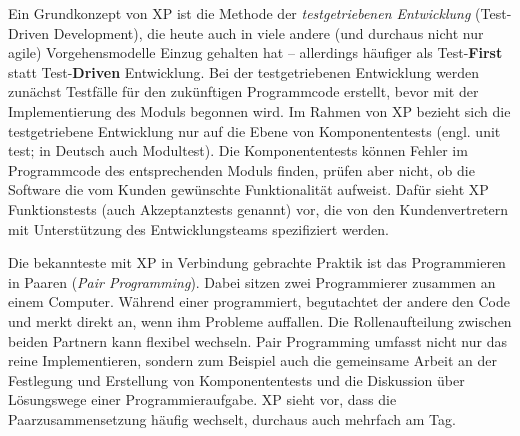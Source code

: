 
Ein Grundkonzept von XP ist die Methode der \textit{testgetriebenen Entwicklung} 
(Test-Driven Development), die heute auch in viele andere (und durchaus nicht nur agile) Vorgehensmodelle Einzug gehalten hat – allerdings häufiger als Test-\textbf{First} statt Test-\textbf{Driven} Entwicklung.
Bei der testgetriebenen Entwicklung  werden zunächst Testfälle für den zukünftigen Programmcode erstellt, bevor mit der Implementierung des Moduls begonnen wird. Im Rahmen von XP bezieht sich die testgetriebene Entwicklung nur auf die Ebene von Komponententests (engl. unit test; in Deutsch auch Modultest). 
Die Komponententests können Fehler im Programmcode des entsprechenden Moduls finden, prüfen aber nicht, ob die Software die vom Kunden gewünschte Funktionalität aufweist. Dafür sieht XP Funktionstests (auch Akzeptanztests genannt) vor, die von den Kundenvertretern mit Unterstützung des Entwicklungsteams spezifiziert werden.

Die bekannteste mit XP in Verbindung gebrachte Praktik ist das Programmieren in Paaren (\textit{Pair Programming}). 
Dabei sitzen zwei Programmierer zusammen an einem Computer. Während einer programmiert, begutachtet der andere den Code und merkt direkt an, wenn ihm Probleme auffallen. Die Rollenaufteilung zwischen beiden Partnern kann flexibel wechseln. Pair  Programming umfasst nicht nur das reine Implementieren, sondern zum Beispiel auch die gemeinsame Arbeit an der Festlegung und Erstellung von Komponententests und die Diskussion über Lösungswege einer Programmieraufgabe. XP sieht vor, dass die Paarzusammensetzung häufig wechselt, durchaus auch mehrfach am Tag. 

